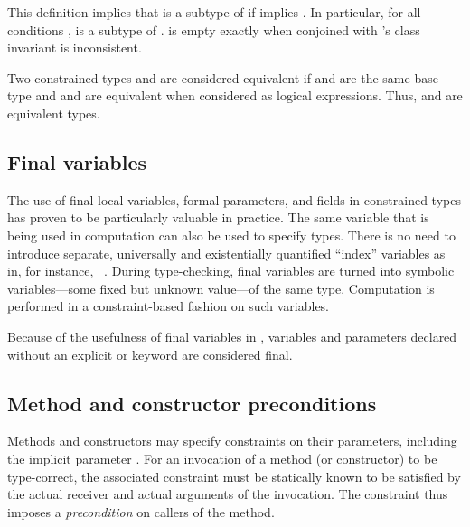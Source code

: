 
This definition 
implies that
 is a subtype of  if 
implies .
In particular, for all conditions ,
 is a subtype of .
 is empty exactly
when  conjoined with 's class invariant is inconsistent.

Two constrained types
 and 
are considered
equivalent if  and  are the same base type and
 and  are equivalent when considered as logical
expressions. Thus,  and  are
equivalent types.

\subsection{Final variables}

The use of final local variables, formal parameters, and
fields in constrained
types has proven to be particularly valuable in practice. The same
variable that is being used in computation can also be used to specify
types. There is no need to introduce separate, universally and
existentially quantified ``index'' variables as in, for
instance, \DML{}~\cite{xi99dependent}.
%
During type-checking, final variables are turned into symbolic
variables---some fixed but unknown value---of the same type.
Computation is performed in a constraint-based fashion on such
variables.

Because of the usefulness of final variables in \Xten{}, variables
and parameters declared without an explicit  or 
keyword are considered final.

\subsection{Method and constructor preconditions}

Methods and constructors may specify constraints on their
parameters, including the implicit parameter .
For an invocation of a method (or constructor) to
be type-correct, the associated constraint must be statically known
to be satisfied by the actual receiver and actual arguments of
the invocation.  The constraint thus imposes a \emph{precondition}
on callers of the method.

